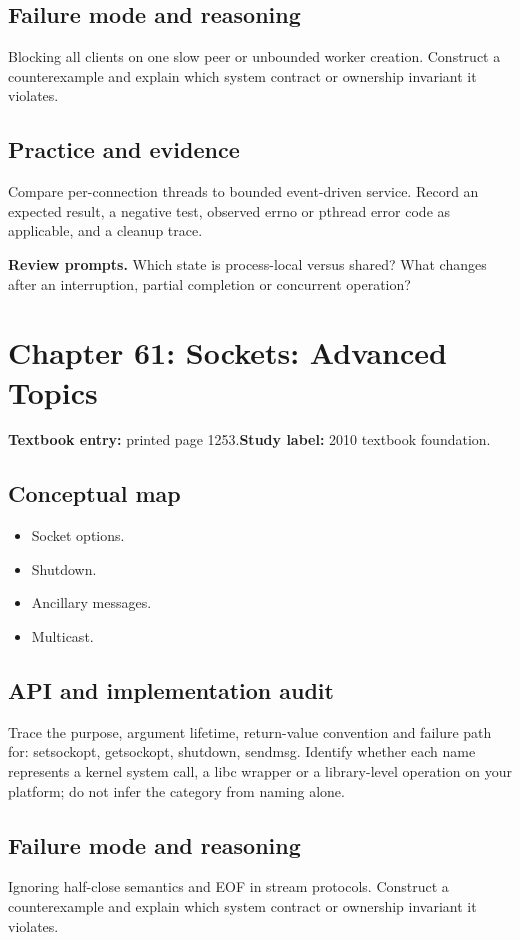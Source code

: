 \documentclass[11pt,letterpaper,oneside]{report}
\begin{document}
\subsection{Failure mode and reasoning}
Blocking all clients on one slow peer or unbounded worker creation. Construct a counterexample and explain which system contract or ownership invariant it violates.

\subsection{Practice and evidence}
Compare per-connection threads to bounded event-driven service. Record an expected result, a negative test, observed errno or pthread error code as applicable, and a cleanup trace.

\textbf{Review prompts.} Which state is process-local versus shared? What changes after an interruption, partial completion or concurrent operation?

\section{Chapter 61: Sockets: Advanced Topics}
\textbf{Textbook entry:} printed page 1253.\quad \textbf{Study label:} 2010 textbook foundation.

\subsection{Conceptual map}
\begin{itemize}
\item Socket options.
\item Shutdown.
\item Ancillary messages.
\item Multicast.
\end{itemize}
\subsection{API and implementation audit}
Trace the purpose, argument lifetime, return-value convention and failure path for: setsockopt, getsockopt, shutdown, sendmsg. Identify whether each name represents a kernel system call, a libc wrapper or a library-level operation on your platform; do not infer the category from naming alone.

\subsection{Failure mode and reasoning}
Ignoring half-close semantics and EOF in stream protocols. Construct a counterexample and explain which system contract or ownership invariant it violates.
\end{document}
